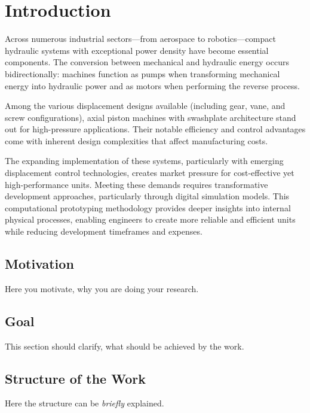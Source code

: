 {\chapter{Introduction}}

\label{sec:introduction}
Across numerous industrial sectors—from aerospace to robotics—compact hydraulic systems with exceptional power density have become essential components. The conversion between mechanical and hydraulic energy occurs bidirectionally: machines function as pumps when transforming mechanical energy into hydraulic power and as motors when performing the reverse process.

\p Among the various displacement designs available (including gear, vane, and screw configurations), axial piston machines with swashplate architecture stand out for high-pressure applications. Their notable efficiency and control advantages come with inherent design complexities that affect manufacturing costs.

\p The expanding implementation of these systems, particularly with emerging displacement control technologies, creates market pressure for cost-effective yet high-performance units. Meeting these demands requires transformative development approaches, particularly through digital simulation models. This computational prototyping methodology provides deeper insights into internal physical processes, enabling engineers to create more reliable and efficient units while reducing development timeframes and expenses.
\section{Motivation}
Here you motivate, why you are doing your research.

\section{Goal}
This section should clarify, what should be achieved by the work.

\section{Structure of the Work}
Here the structure can be \emph{briefly} explained.


